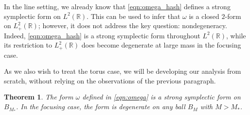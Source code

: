 \documentclass{amsart}
\numberwithin{equation}{section}
\newtheorem{theorem}{Theorem}[section]
\theoremstyle{definition}
\newcommand{\om}{\omega}
\newcommand{\R}{\mathbb{R}}
\begin{document}
In the line setting, we already know that \eqref{eqn:omega_hash} defines a strong symplectic form on $L^2(\R)$.  This can be used to infer that $\omega$ is a closed $2$-form on $L^2_+(\R)$; however, it does not address the key question: nondegeneracy.  Indeed, \eqref{eqn:omega_hash} is a strong symplectic form throughout $L^2(\R)$, while its restriction to $L^2_+(\R)$ does become degenerate at large mass in the focusing case. 

As we also wish to treat the torus case, we will be developing our analysis from scratch, without relying on the observations of the previous paragraph.





\begin{theorem}\label{T:symplectic form}
The form $\om$ defined in \eqref{eqn:omega} is a strong symplectic form on $B_{M_*}$. In the focusing case, the form is degenerate on any ball $B_M$ with $M>M_*$.
\end{theorem}
\end{document}
